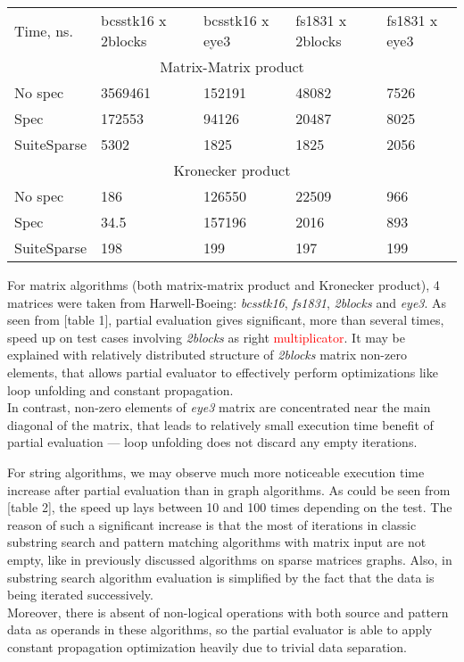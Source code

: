 \documentclass[conference]{IEEEtran}
\begin{document}
\begin{table}[]
	\begin{tabular}{lllll}
		Time, ns.   & bcsstk16 x 2blocks & bcsstk16 x eye3 & fs1831 x 2blocks & fs1831 x eye3 \\
		\multicolumn{5}{c}{Matrix-Matrix product}                                             \\
		No spec     & 3569461            & 152191          & 48082            & 7526          \\
		Spec        & 172553             & 94126           & 20487            & 8025          \\
		SuiteSparse & 5302               & 1825            & 1825             & 2056          \\
		\multicolumn{5}{c}{Kronecker product}                                                 \\
		No spec     & 186                & 126550          & 22509            & 966           \\
		Spec        & 34.5               & 157196          & 2016             & 893           \\
		SuiteSparse & 198                & 199             & 197              & 199          
	\end{tabular}
\end{table}

For matrix algorithms (both matrix-matrix product and Kronecker product), 4 matrices were taken from Harwell-Boeing: \textit{bcsstk16}, \textit{fs1831}, \textit{2blocks} and \textit{eye3}. As seen from [table 1], partial evaluation gives significant, more than several times, speed up on test cases involving \textit{2blocks} as right \textcolor{red}{multiplicator}. It may be explained with relatively distributed structure of \textit{2blocks} matrix non-zero elements, that allows partial evaluator to effectively perform optimizations like loop unfolding and constant propagation.\\
In contrast, non-zero elements of \textit{eye3} matrix are concentrated near the main diagonal of the matrix, that leads to relatively small execution time benefit of partial evaluation --- loop unfolding does not discard any empty iterations.

For string algorithms, we may observe much more noticeable execution time increase after partial evaluation than in graph algorithms. As could be seen from [table 2], the speed up lays between 10 and 100 times depending on the test. The reason of such a significant increase is that the most of iterations in classic substring search and pattern matching algorithms \cite{cormen2009introduction} with matrix input are not empty, like in previously discussed algorithms on sparse matrices graphs. Also, in substring search algorithm evaluation is simplified by the fact that the data is being iterated successively.\\
Moreover, there is absent of non-logical operations with both source and pattern data as operands in these algorithms, so the partial evaluator is able to apply constant propagation optimization heavily due to trivial data separation.
\end{document}
